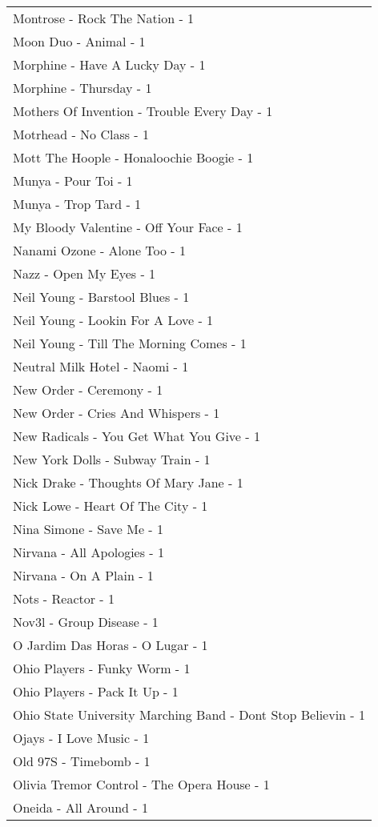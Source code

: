 \documentclass[
]{article}
\begin{document}
\begin{longtable}{l}
Montrose - Rock The Nation - 1 \\ 
Moon Duo - Animal - 1 \\ 
Morphine - Have A Lucky Day - 1 \\ 
Morphine - Thursday - 1 \\ 
Mothers Of Invention - Trouble Every Day - 1 \\ 
Motrhead - No Class - 1 \\ 
Mott The Hoople - Honaloochie Boogie - 1 \\ 
Munya - Pour Toi - 1 \\ 
Munya - Trop Tard - 1 \\ 
My Bloody Valentine - Off Your Face - 1 \\ 
Nanami Ozone - Alone Too - 1 \\ 
Nazz - Open My Eyes - 1 \\ 
Neil Young - Barstool Blues - 1 \\ 
Neil Young - Lookin For A Love - 1 \\ 
Neil Young - Till The Morning Comes - 1 \\ 
Neutral Milk Hotel - Naomi - 1 \\ 
New Order - Ceremony - 1 \\ 
New Order - Cries And Whispers - 1 \\ 
New Radicals - You Get What You Give - 1 \\ 
New York Dolls - Subway Train - 1 \\ 
Nick Drake - Thoughts Of Mary Jane - 1 \\ 
Nick Lowe - Heart Of The City - 1 \\ 
Nina Simone - Save Me - 1 \\ 
Nirvana - All Apologies - 1 \\ 
Nirvana - On A Plain - 1 \\ 
Nots - Reactor - 1 \\ 
Nov3l - Group Disease - 1 \\ 
O Jardim Das Horas - O Lugar - 1 \\ 
Ohio Players - Funky Worm - 1 \\ 
Ohio Players - Pack It Up - 1 \\ 
Ohio State University Marching Band - Dont Stop Believin - 1 \\ 
Ojays - I Love Music - 1 \\ 
Old 97S - Timebomb - 1 \\ 
Olivia Tremor Control - The Opera House - 1 \\ 
Oneida - All Around - 1 \\ 

\end{longtable}
\end{document}
